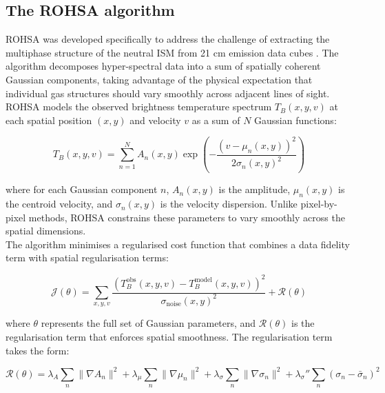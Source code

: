 \subsection{The ROHSA algorithm}
\label{subsec:rohsa_algorithm}

ROHSA was developed specifically to address the challenge of extracting the multiphase structure of the neutral ISM from 21 cm emission data cubes \citep{Marchal2019}. The algorithm decomposes hyper-spectral data into a sum of spatially coherent Gaussian components, taking advantage of the physical expectation that individual gas structures should vary smoothly across adjacent lines of sight.\\\indent
ROHSA models the observed brightness temperature spectrum $T_B(x, y, v)$ at each spatial position $(x, y)$ and velocity $v$ as a sum of $N$ Gaussian functions:

\begin{equation}
	T_B(x, y, v) = \sum_{n=1}^{N} A_n(x, y) \exp\left(-\frac{(v - \mu_n(x, y))^2}{2\sigma_n(x, y)^2}\right)
	\label{eq:gaussian_model}
\end{equation}

\noindent where for each Gaussian component $n$, $A_n(x, y)$ is the amplitude, $\mu_n(x, y)$ is the centroid velocity, and $\sigma_n(x, y)$ is the velocity dispersion. Unlike pixel-by-pixel methods, ROHSA constrains these parameters to vary smoothly across the spatial dimensions.\\\indent
The algorithm minimises a regularised cost function that combines a data fidelity term with spatial regularisation terms:

\begin{equation}
	\mathcal{J}(\theta) = \sum_{x,y,v} \frac{(T_B^{\mathrm{obs}}(x,y,v) - T_B^{\mathrm{model}}(x,y,v))^2}{\sigma_{\mathrm{noise}}(x,y)^2} + \mathcal{R}(\theta)
	\label{eq:cost_function}
\end{equation}

\noindent where $\theta$ represents the full set of Gaussian parameters, and $\mathcal{R}(\theta)$ is the regularisation term that enforces spatial smoothness. The regularisation term takes the form:

\begin{equation}
	\mathcal{R}(\theta) = \lambda_A \sum_n \|\nabla A_n\|^2 + \lambda_\mu \sum_n \|\nabla \mu_n\|^2 + \lambda_\sigma \sum_n \|\nabla \sigma_n\|^2 + \lambda_\sigma'' \sum_n (\sigma_n - \bar{\sigma}_n)^2
	\label{eq:regularisation}
\end{equation}

